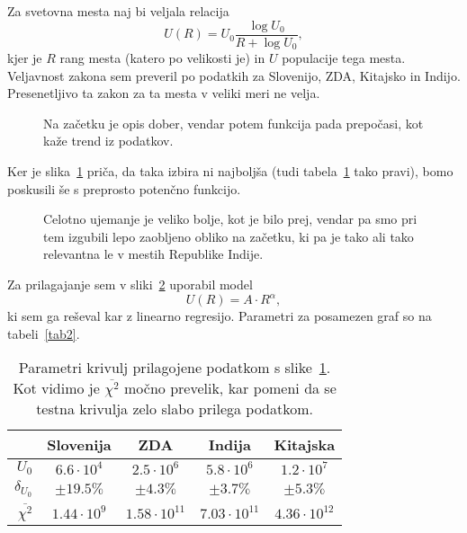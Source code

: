 \documentclass[a4 paper, 12pt]{article}
\begin{document}
Za svetovna mesta naj bi veljala relacija
\[
	U(R) = U_0 \frac{\log U_0}{R + \log U_0},
\]
kjer je $R$ rang mesta (katero po velikosti je) in $U$ populacije tega mesta. Veljavnost zakona sem preveril po
podatkih za Slovenijo, ZDA, Kitajsko in Indijo. Presenetljivo ta zakon za ta mesta v veliki meri ne velja.
\begin{figure}[H]\centering
	
	\caption{Na za\v cetku je opis dober, vendar potem funkcija pada prepo\v casi, kot ka\v ze trend iz podatkov.}
	\label{gr:mest1}
\end{figure}
Ker je slika~\ref{gr:mest1} pri\v ca, da taka izbira ni najbolj\v sa (tudi tabela~\ref{tab1} tako pravi), bomo poskusili
\v se s preprosto poten\v cno funkcijo.
\begin{figure}[H]\centering
	
	\caption{Celotno ujemanje je veliko bolje, kot je bilo prej, vendar pa smo pri tem izgubili lepo
		zaobljeno obliko na za\v cetku, ki pa je tako ali tako relevantna le v mestih Republike Indije.}
	\label{gr:mest2}
\end{figure}
Za prilagajanje sem v sliki~\ref{gr:mest2} uporabil model
\[
	U(R) = A \cdot R^{\alpha},
\]
ki sem ga re\v seval kar z linearno regresijo. Parametri za posamezen graf so na tabeli~\ref{tab2}.
\begin{table}[H]\centering
	\caption{Parametri krivulj prilagojene podatkom s slike~\ref{gr:mest1}. Kot vidimo je $\overline{\chi^2}$
		mo\v cno prevelik, kar pomeni da se testna krivulja zelo slabo prilega podatkom.}
	\begin{tabular}{r|c|c|c|c}
		& Slovenija & ZDA & Indija & Kitajska \\
		\hline
		$U_0$          & $6.6 \cdot 10^4$ & $2.5 \cdot 10^6$ & $5.8 \cdot 10^6$ & $1.2 \cdot10^7$ \\
		$\delta_{U_0}$ & $\pm 19.5 \%$    & $\pm 4.3 \%$     & $\pm 3.7 \%$     & $\pm 5.3 \%$ \\
		\hline
		$\overline{\chi^2}$ & $1.44 \cdot 10^{9}$ & $1.58 \cdot 10^{11}$ & $7.03 \cdot 10^{11}$ & $4.36 \cdot 10^{12}$
	\end{tabular}
	\label{tab1}
\end{table}
\end{document}
